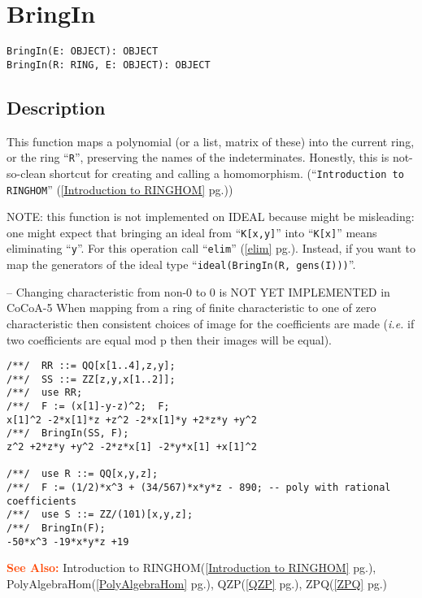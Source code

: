 \documentclass[a4paper]{mybook}
\newenvironment{command}{}{} %
\newcommand\SeeAlso{\par\textcolor{OrangeRed}{\textbf{\large See Also: }}}
\begin{document}
\section{BringIn}
\label{BringIn}
\begin{command} %


\begin{Verbatim}[label=syntax, rulecolor=\color{MidnightBlue},
frame=single]
BringIn(E: OBJECT): OBJECT
BringIn(R: RING, E: OBJECT): OBJECT
\end{Verbatim}


\subsection*{Description}

This function maps a polynomial (or a list, matrix of these) into the
current ring, or the ring ``\verb&R&'', preserving the names of the indeterminates.
Honestly, this is not-so-clean shortcut for creating and calling a
homomorphism.  (``\verb&Introduction to RINGHOM&'' (\ref{Introduction to RINGHOM} pg.\pageref{Introduction to RINGHOM}))
\par 
NOTE: this function is not implemented on IDEAL because might be
misleading: one might expect that bringing an ideal from ``\verb&K[x,y]&''
into ``\verb&K[x]&'' means eliminating ``\verb&y&''.  For this operation
call ``\verb&elim&'' (\ref{elim} pg.\pageref{elim}).
Instead, if you want to map the generators of the ideal type
``\verb&ideal(BringIn(R, gens(I)))&''.
\par 
-- Changing characteristic from non-0 to 0 is NOT YET IMPLEMENTED in CoCoA-5
When mapping from a ring of finite characteristic to one of zero
characteristic then consistent choices of image for the coefficients
are made (\textit{i.e.} if two coefficients are equal mod p then their images
will be equal).
\begin{Verbatim}[label=example, rulecolor=\color{PineGreen}, frame=single]
/**/  RR ::= QQ[x[1..4],z,y];
/**/  SS ::= ZZ[z,y,x[1..2]];
/**/  use RR;
/**/  F := (x[1]-y-z)^2;  F;
x[1]^2 -2*x[1]*z +z^2 -2*x[1]*y +2*z*y +y^2
/**/  BringIn(SS, F);
z^2 +2*z*y +y^2 -2*z*x[1] -2*y*x[1] +x[1]^2

/**/  use R ::= QQ[x,y,z];
/**/  F := (1/2)*x^3 + (34/567)*x*y*z - 890; -- poly with rational coefficients
/**/  use S ::= ZZ/(101)[x,y,z];
/**/  BringIn(F);
-50*x^3 -19*x*y*z +19
\end{Verbatim}


\SeeAlso %
  Introduction to RINGHOM(\ref{Introduction to RINGHOM} pg.\pageref{Introduction to RINGHOM}), 
    PolyAlgebraHom(\ref{PolyAlgebraHom} pg.\pageref{PolyAlgebraHom}), 
    QZP(\ref{QZP} pg.\pageref{QZP}), 
    ZPQ(\ref{ZPQ} pg.\pageref{ZPQ})
\end{command} %
\end{document}
